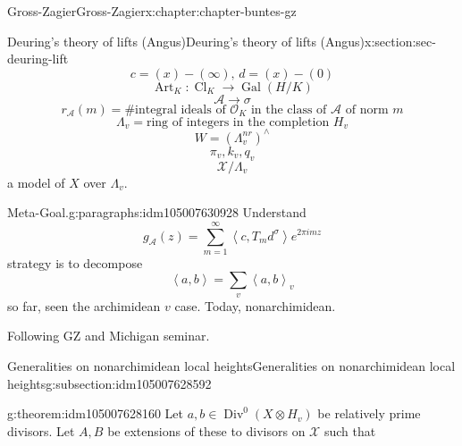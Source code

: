 \documentclass[oneside,10pt,]{book}
\numberwithin{equation}{section}
\newcommand{\pair}[2]{\left\langle #1, #2 \right\rangle}
\newcommand{\ints}{\mathcal{O}}
\DeclareMathOperator{\Div}{Div}
\DeclareMathOperator{\Cl}{Cl}
\newcommand{\Gal}[2]{\operatorname{Gal}(#1/#2)}
\begin{document}
\begin{chapterptx}{Gross-Zagier}{}{Gross-Zagier}{}{}{x:chapter:chapter-buntes-gz}
\begin{sectionptx}{Deuring's theory of lifts (Angus)}{}{Deuring's theory of lifts (Angus)}{}{}{x:section:sec-deuring-lift}
\begin{equation*}
c = (x) - (\infty ),\, d = (x) - (0)
\end{equation*}
%
\begin{equation*}
\operatorname{Art}_K \colon \Cl_K \to \Gal H K
\end{equation*}
%
\begin{equation*}
\mathscr A \to \sigma 
\end{equation*}
%
\begin{equation*}
r_{\mathscr A}(m) = \# \text{integral ideals of }\ints_K\text{ in the class of }\mathscr A \text{ of norm }m
\end{equation*}
%
\begin{equation*}
\Lambda _v = \text{ring of integers in the completion }H_v
\end{equation*}
%
\begin{equation*}
W = (\Lambda _v^{nr})^\wedge
\end{equation*}
%
\begin{equation*}
\pi _v, k_v, q_v
\end{equation*}
%
\begin{equation*}
\mathcal X/\Lambda _v
\end{equation*}
a model of \(X\) over \(\Lambda _v\).%
\begin{paragraphs}{Meta-Goal.}{g:paragraphs:idm105007630928}%
Understand%
\begin{equation*}
g_{\mathscr A}(z) = \sum_{m=1}^\infty \pair c {T_m d^\sigma } e^{2\pi  i m z}
\end{equation*}
strategy is to decompose%
\begin{equation*}
\pair a b = \sum_v \pair ab_v
\end{equation*}
so far, seen the archimidean \(v\) case. Today, nonarchimidean.%
\par
Following GZ and Michigan seminar.%
\end{paragraphs}%
%
%
\typeout{************************************************}
\typeout{************************************************}
%
\begin{subsectionptx}{Generalities on nonarchimidean local heights}{}{Generalities on nonarchimidean local heights}{}{}{g:subsection:idm105007628592}
\begin{theorem}{}{}{g:theorem:idm105007628160}%
Let \(a,b\in \Div^0(X \otimes H_v)\) be relatively prime divisors. Let \(A,B\) be extensions of these to divisors on \(\mathcal X\) such that%
\begin{equation*}

\end{equation*}
\end{theorem}
\end{subsectionptx}
\end{sectionptx}
\end{chapterptx}
\end{document}

